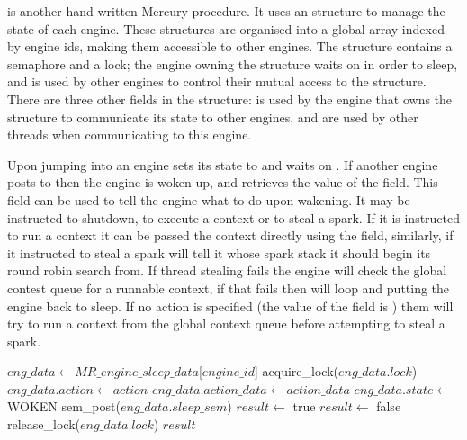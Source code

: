 \sleep is another hand written Mercury procedure.
It uses an
\enginesleepsync structure to manage the state of each engine.
These structures are organised into a global array indexed by engine ids,
making them accessible to other engines.
The structure contains a semaphore and a lock;
the engine owning the structure waits on  in order to
sleep,
and  is used by other engines to control their mutual
access to the \enginesleepsync structure.
There are three other fields in the structure:
 is used by the engine that owns the structure to communicate
its state to other engines,
 and  are used by other threads when
communicating to this engine.

Upon jumping into \idle an engine sets its state to  and
waits on .
If another engine posts to  then the engine is woken up,
and retrieves the value of the  field.
This field can be used to tell the engine what to do upon wakening.
It may be instructed to shutdown, to execute a context or to steal a spark.
If it is instructed to run a context it can be passed the context directly
using the  field,
similarly, if it instructed to steal a spark  will tell
it whose spark stack it should begin its round robin search from.
If thread stealing fails the engine will check the global contest queue for
a runnable context,
if that fails then \idle will loop and putting the engine back to sleep.
If no action is specified
(the value of the  field is )
them \sleep will try to run a context from the global context queue before
attempting to steal a spark.

\begin{algorithm}[tbp]
\begin{algorithmic}
    \State $eng\_data \gets MR\_engine\_sleep\_data$[$engine\_id$]
    \State acquire\_lock($eng\_data.lock$)
        \State $eng\_data.action \gets action$
        \State $eng\_data.action\_data \gets action\_data$
        \State $eng\_data.state \gets$ WOKEN
        \State sem\_post($eng\_data.sleep\_sem$)
        \State $result \gets$ true
    \Else
        \State $result \gets$ false
    \EndIf
    \State release\_lock($eng\_data.lock$)
    \Return $result$
\EndProcedure
\end{algorithmic}
\caption{\wakeengine}
\label{alg:wake_engine}
\end{algorithm}


